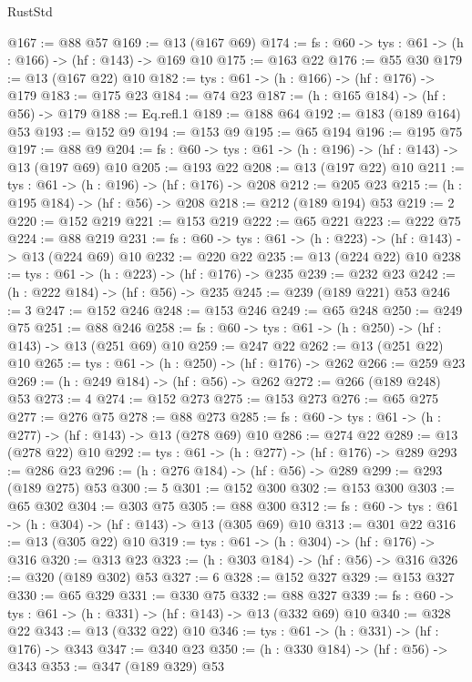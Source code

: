 \begin{lexlean}{RustStd}
\begin{coremodule}
@167 := @88 @57
@169 := @13 (@167 @69)
@174 := {fs : @60} -> {tys : @61} -> (h : @166) -> (hf : @143) -> @169 @10
@175 := @163 @22
@176 := @55 @30
@179 := @13 (@167 @22) @10
@182 := {tys : @61} -> (h : @166) -> (hf : @176) -> @179
@183 := @175 @23
@184 := @74 @23
@187 := (h : @165 @184) -> (hf : @56) -> @179
@188 := Eq.refl.{1}
@189 := @188 @64
@192 := @183 (@189 @164) @53
@193 := @152 @9
@194 := @153 @9
@195 := @65 @194
@196 := @195 @75
@197 := @88 @9
@204 := {fs : @60} -> {tys : @61} -> (h : @196) -> (hf : @143) -> @13 (@197 @69) @10
@205 := @193 @22
@208 := @13 (@197 @22) @10
@211 := {tys : @61} -> (h : @196) -> (hf : @176) -> @208
@212 := @205 @23
@215 := (h : @195 @184) -> (hf : @56) -> @208
@218 := @212 (@189 @194) @53
@219 := 2
@220 := @152 @219
@221 := @153 @219
@222 := @65 @221
@223 := @222 @75
@224 := @88 @219
@231 := {fs : @60} -> {tys : @61} -> (h : @223) -> (hf : @143) -> @13 (@224 @69) @10
@232 := @220 @22
@235 := @13 (@224 @22) @10
@238 := {tys : @61} -> (h : @223) -> (hf : @176) -> @235
@239 := @232 @23
@242 := (h : @222 @184) -> (hf : @56) -> @235
@245 := @239 (@189 @221) @53
@246 := 3
@247 := @152 @246
@248 := @153 @246
@249 := @65 @248
@250 := @249 @75
@251 := @88 @246
@258 := {fs : @60} -> {tys : @61} -> (h : @250) -> (hf : @143) -> @13 (@251 @69) @10
@259 := @247 @22
@262 := @13 (@251 @22) @10
@265 := {tys : @61} -> (h : @250) -> (hf : @176) -> @262
@266 := @259 @23
@269 := (h : @249 @184) -> (hf : @56) -> @262
@272 := @266 (@189 @248) @53
@273 := 4
@274 := @152 @273
@275 := @153 @273
@276 := @65 @275
@277 := @276 @75
@278 := @88 @273
@285 := {fs : @60} -> {tys : @61} -> (h : @277) -> (hf : @143) -> @13 (@278 @69) @10
@286 := @274 @22
@289 := @13 (@278 @22) @10
@292 := {tys : @61} -> (h : @277) -> (hf : @176) -> @289
@293 := @286 @23
@296 := (h : @276 @184) -> (hf : @56) -> @289
@299 := @293 (@189 @275) @53
@300 := 5
@301 := @152 @300
@302 := @153 @300
@303 := @65 @302
@304 := @303 @75
@305 := @88 @300
@312 := {fs : @60} -> {tys : @61} -> (h : @304) -> (hf : @143) -> @13 (@305 @69) @10
@313 := @301 @22
@316 := @13 (@305 @22) @10
@319 := {tys : @61} -> (h : @304) -> (hf : @176) -> @316
@320 := @313 @23
@323 := (h : @303 @184) -> (hf : @56) -> @316
@326 := @320 (@189 @302) @53
@327 := 6
@328 := @152 @327
@329 := @153 @327
@330 := @65 @329
@331 := @330 @75
@332 := @88 @327
@339 := {fs : @60} -> {tys : @61} -> (h : @331) -> (hf : @143) -> @13 (@332 @69) @10
@340 := @328 @22
@343 := @13 (@332 @22) @10
@346 := {tys : @61} -> (h : @331) -> (hf : @176) -> @343
@347 := @340 @23
@350 := (h : @330 @184) -> (hf : @56) -> @343
@353 := @347 (@189 @329) @53

\end{coremodule}
\end{lexlean}
